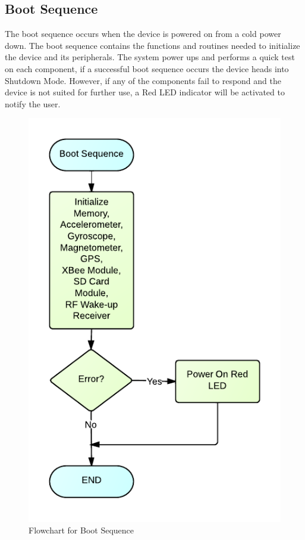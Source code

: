 \subsection{Boot Sequence}
The boot sequence occurs when the device is powered on from a cold power down. The boot sequence contains the functions and routines needed to initialize the device and its peripherals. The system power ups and performs a quick test on each component, if a successful boot sequence occurs the device heads into Shutdown Mode. However, if any of the components fail to respond and the device is not suited for further use, a Red LED indicator will be activated to notify the user.
\begin{figure}[H]
	\centering
	\includegraphics[scale=1.0]{img/BootSequenceFlowchart}
	\caption{Flowchart for Boot Sequence \label{fig:bootSequence}}
\end{figure}

